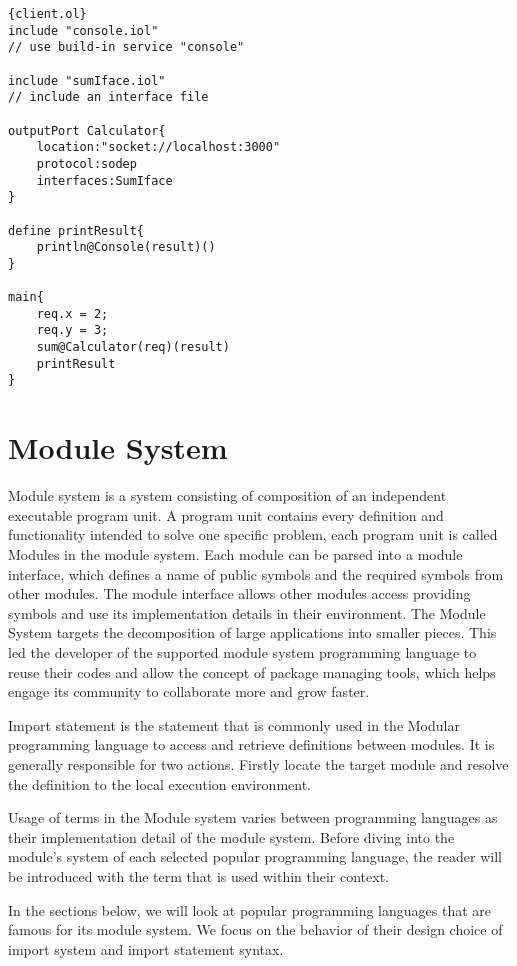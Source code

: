 \begin{listing}[h]


    \lstset{language=Jolie,
        style=codeStyle,
        numbers=left,
        firstnumber=1
    }
    \begin{lstlisting}[frame=tlrb]{client.ol}
include "console.iol" 
// use build-in service "console"

include "sumIface.iol" 
// include an interface file 

outputPort Calculator{
    location:"socket://localhost:3000"
    protocol:sodep 
    interfaces:SumIface
}

define printResult{
    println@Console(result)()
}

main{
    req.x = 2;
    req.y = 3;
    sum@Calculator(req)(result)
    printResult
}
\end{lstlisting}
    \caption{Sum client example}
    \label{list:example-client}
\end{listing}

\section{Module System}

Module system is a system consisting of composition of an independent executable program unit. A program unit contains every definition and functionality intended to solve one specific problem, each program unit is called Modules in the module system. Each module can be parsed into a module interface, which defines a name of public symbols and the required symbols from other modules. The module interface allows other modules access providing symbols and use its implementation details in their environment. The Module System targets the decomposition of large applications into smaller pieces. This led the developer of the supported module system programming language to reuse their codes and allow the concept of package managing tools, which helps engage its community to collaborate more and grow faster.

Import statement is the statement that is commonly used in the Modular programming language to access and retrieve definitions between modules. It is generally responsible for two actions. Firstly locate the target module and resolve the definition to the local execution environment.

Usage of terms in the Module system varies between programming languages as their implementation detail of the module system. Before diving into the module's system of each selected popular programming language, the reader will be introduced with the term that is used within their context.

In the sections below, we will look at popular programming languages that are famous for its module system. We focus on the behavior of their design choice of import system and import statement syntax.



